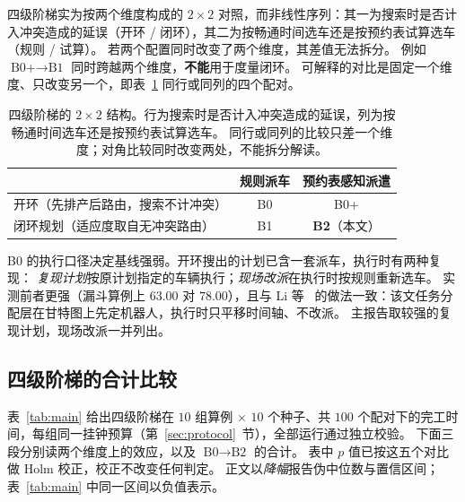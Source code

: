 \documentclass[manuscript,screen,review]{acmart}
\newcommand{\NCases}{10}
\newcommand{\NSeeds}{10}
\newcommand{\NPairs}{100}
\begin{document}
四级阶梯实为按两个维度构成的 $2\times2$ 对照，而非线性序列：其一为搜索时是否计入冲突造成的延误（开环 / 闭环），其二为按畅通时间选车还是按预约表试算选车（规则 / 试算）。
若两个配置同时改变了两个维度，其差值无法拆分。
例如 $\text{B0+}\to\text{B1}$ 同时跨越两个维度，\textbf{不能}用于度量闭环。
可解释的对比是固定一个维度、只改变另一个，即表~\ref{tab:arms} 同行或同列的四个配对。

\begin{table}[t]
\caption{四级阶梯的 $2\times2$ 结构。行为搜索时是否计入冲突造成的延误，列为按畅通时间选车还是按预约表试算选车。
同行或同列的比较只差一个维度；对角比较同时改变两处，不能拆分解读。}
\label{tab:arms}
\footnotesize
\begin{tabular}{@{}lcc@{}}
\toprule
 & 规则派车 & 预约表感知派遣 \\
\midrule
开环（先排产后路由，搜索不计冲突） & B0 & B0+ \\
闭环规划（适应度取自无冲突路由） & B1 & \textbf{B2}（本文） \\
\bottomrule
\end{tabular}
\end{table}

B0 的执行口径决定基线强弱。开环搜出的计划已含一套派车，执行时有两种复现：
\emph{复现计划}按原计划指定的车辆执行；\emph{现场改派}在执行时按规则重新选车。
实测前者更强（漏斗算例上 $63.00$ 对 $78.00$），且与 Li 等~\cite{li2026framework} 的做法一致：该文任务分配层在甘特图上先定机器人，执行时只平移时间轴、不改派。
主报告取较强的复现计划，现场改派一并列出。

\subsection{四级阶梯的合计比较}
\label{sec:main}

表~\ref{tab:main} 给出四级阶梯在 $\NCases$ 组算例 $\times$ $\NSeeds$ 个种子、共
$\NPairs$ 个配对下的完工时间，每组同一挂钟预算（第~\ref{sec:protocol}~节），全部运行通过独立校验。
下面三段分别读两个维度上的效应，以及 $\text{B0}\to\text{B2}$ 的合计。
表中 $p$ 值已按这五个对比做 Holm 校正，校正不改变任何判定。
正文以\emph{降幅}报告伪中位数与置信区间；表~\ref{tab:main} 中同一区间以负值表示。

\begin{table}[t]
\caption{四级阶梯在同挂钟预算下的完工时间，以及两个维度上只改一处的四个配对。
负值表示完工时间下降，即更好。$n=\NPairs$ 个按 $(\text{算例},\text{种子})$ 配对的比较，
双侧 Wilcoxon 符号秩检验；$p$ 值已按本表五个对比做 Holm 校正
($^{*}p<0.05$、$^{**}p<0.01$、$^{***}p<0.001$)。HL 列为逐对相对增益的 Hodges--Lehmann
伪中位数及其 $95\%$ 分布无关置信区间（见第~\ref{sec:protocol}~节）。
表头加粗者为本文配置；数值不加粗，因 B2 并非每组最优（逐组结果见表~\ref{tab:bytag}）。}
\label{tab:main}
\small

\end{table}
\end{document}

